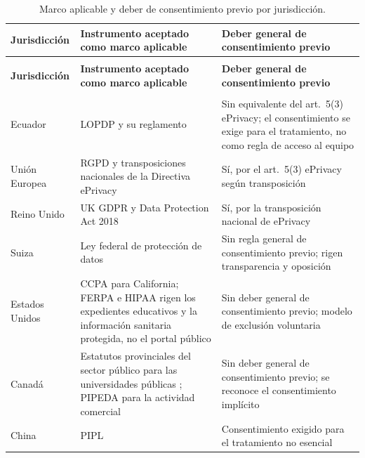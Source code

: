 \documentclass[pdflatex,sn-basic,Numbered]{sn-jnl}
\theoremstyle{thmstyleone}
\theoremstyle{thmstyletwo}
\theoremstyle{thmstylethree}
\begin{document}
\begin{appendices}
\footnotesize
\begin{longtable}{@{}>{\RaggedRight}p{2.4cm}>{\RaggedRight}p{5.5cm}>{\RaggedRight\arraybackslash}p{4.1cm}@{}}
	\caption{Marco aplicable y deber de consentimiento previo por jurisdicci\'on.}\label{tab:mapeo}\\
	\toprule
	\textbf{Jurisdicci\'on} & \textbf{Instrumento aceptado como marco aplicable} & \textbf{Deber general de consentimiento previo} \\
	\midrule
	\endfirsthead
	\multicolumn{3}{c}{\textit{(Cuadro~\ref{tab:mapeo}, continuaci\'on)}}\\
	\toprule
	\textbf{Jurisdicci\'on} & \textbf{Instrumento aceptado como marco aplicable} & \textbf{Deber general de consentimiento previo} \\
	\midrule
	\endhead
	\midrule
	\multicolumn{3}{r}{\textit{Contin\'ua en la siguiente p\'agina}}\\
	\endfoot
	\bottomrule
	\endlastfoot
	Ecuador & LOPDP y su reglamento \citep{lopdp2021,reglamentolopdp2023} & Sin equivalente del art.\ 5(3) ePrivacy; el consentimiento se exige para el tratamiento, no como regla de acceso al equipo \\
	\addlinespace
	Uni\'on Europea & RGPD \citep{gdpr2016} y transposiciones nacionales de la Directiva ePrivacy \citep{eprivacy2002} & S\'i, por el art.\ 5(3) ePrivacy seg\'un transposici\'on \citep{edpb2024eprivacy} \\
	\addlinespace
	Reino Unido & UK GDPR y Data Protection Act 2018 \citep{ukdpa2018} & S\'i, por la transposici\'on nacional de ePrivacy \\
	\addlinespace
	Suiza & Ley federal de protecci\'on de datos \citep{fadp_ch} & Sin regla general de consentimiento previo; rigen transparencia y oposici\'on \\
	\addlinespace
	Estados Unidos & CCPA \citep{ccpa2018} para California; FERPA \citep{ferpa1974} e HIPAA \citep{hipaa1996} rigen los expedientes educativos y la informaci\'on sanitaria protegida, no el portal p\'ublico & Sin deber general de consentimiento previo; modelo de exclusi\'on voluntaria \\
	\addlinespace
	Canad\'a & Estatutos provinciales del sector p\'ublico para las universidades p\'ublicas \citep{fippa_on,fippa_bc,quebec_privacy}; PIPEDA \citep{pipeda2000} para la actividad comercial & Sin deber general de consentimiento previo; se reconoce el consentimiento impl\'icito \\
	\addlinespace
	China & PIPL \citep{pipl2021} & Consentimiento exigido para el tratamiento no esencial \\

\end{longtable}
\end{appendices}
\end{document}
